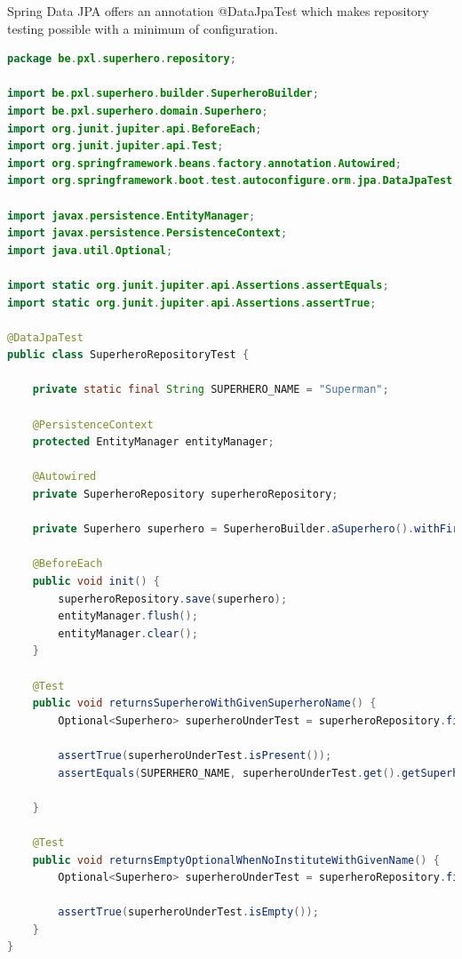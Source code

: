 Spring Data JPA offers an annotation @DataJpaTest which makes repository testing possible with a minimum of configuration. 


\begin{lstlisting}[frame=single, language=java]
package be.pxl.superhero.repository;

import be.pxl.superhero.builder.SuperheroBuilder;
import be.pxl.superhero.domain.Superhero;
import org.junit.jupiter.api.BeforeEach;
import org.junit.jupiter.api.Test;
import org.springframework.beans.factory.annotation.Autowired;
import org.springframework.boot.test.autoconfigure.orm.jpa.DataJpaTest;

import javax.persistence.EntityManager;
import javax.persistence.PersistenceContext;
import java.util.Optional;

import static org.junit.jupiter.api.Assertions.assertEquals;
import static org.junit.jupiter.api.Assertions.assertTrue;

@DataJpaTest
public class SuperheroRepositoryTest {

	private static final String SUPERHERO_NAME = "Superman";

	@PersistenceContext
	protected EntityManager entityManager;

	@Autowired
	private SuperheroRepository superheroRepository;

	private Superhero superhero = SuperheroBuilder.aSuperhero().withFirstName("Clark").withLastName("Kent").withSuperheroName(SUPERHERO_NAME).build();

	@BeforeEach
	public void init() {
		superheroRepository.save(superhero);
		entityManager.flush();
		entityManager.clear();
	}

	@Test
	public void returnsSuperheroWithGivenSuperheroName() {
		Optional<Superhero> superheroUnderTest = superheroRepository.findSuperheroBySuperheroName(SUPERHERO_NAME);

		assertTrue(superheroUnderTest.isPresent());
		assertEquals(SUPERHERO_NAME, superheroUnderTest.get().getSuperheroName());

	}

	@Test
	public void returnsEmptyOptionalWhenNoInstituteWithGivenName() {
		Optional<Superhero> superheroUnderTest = superheroRepository.findSuperheroBySuperheroName("Robin Hood");

		assertTrue(superheroUnderTest.isEmpty());
	}
}

\end{lstlisting}






